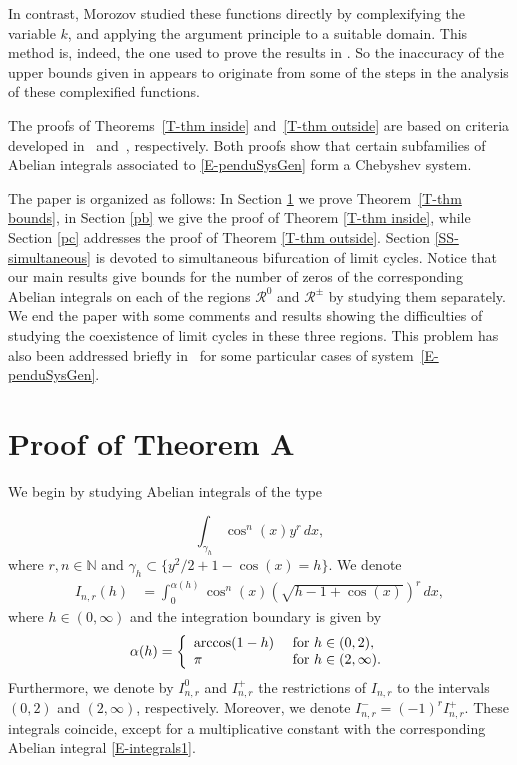 \documentclass[12pt,psamsfonts]{amsart}
\begin{document}
In contrast, Morozov studied these functions directly by complexifying the variable $k$, and
applying the argument principle to a suitable domain. This method is, indeed,  the one used to prove the results in \cite{Gasull2002}.  So the inaccuracy of the  upper bounds given in \cite{Morozov} appears to originate from some of the steps in the analysis of these complexified functions.

The proofs of Theorems~\ref{T-thm inside} and~\ref{T-thm outside} are based on criteria developed
in~\cite{Grau2011} and~\cite{Gasull2012b}, respectively. Both proofs show that certain subfamilies
of Abelian integrals associated  to \eqref{E-penduSysGen}  form a Chebyshev system. 

\bigskip

The  paper is organized as follows:  In Section \ref{pa} we prove Theorem~\ref{T-thm bounds}, in
Section \ref{pb} we give the proof of Theorem \ref{T-thm inside}, while Section \ref{pc} addresses the proof of Theorem \ref{T-thm outside}.  Section \ref{SS-simultaneous} is devoted to
simultaneous bifurcation of limit cycles. Notice that our main results give bounds for the number
of zeros of the corresponding Abelian integrals on each of the  regions $\mathcal{R}^0$ and
$\mathcal{R}^\pm$ by studying  them separately. We end the paper with some comments and results
showing the difficulties of studying the coexistence of limit cycles in these three regions.
This problem has also been addressed briefly in~\cite{Morozov1989,Sanders1986} for
some particular cases of system~\eqref{E-penduSysGen}.

\section{Proof of Theorem A}\label{pa}
We begin by studying Abelian integrals of the type

\begin{equation}
\label{E-integrals1}
    \int_{{\gamma}_h} \cos^n(x) y^r \, dx,
\end{equation}
where $r,n\in{\mathbb{N}}$ and ${\gamma}_h\subset\{{y^2}/{2}+1-\cos(x)=h\}$. We denote
\begin{align}
\label{E-integrals2}
    I_{n,r} (h) & =   \int_0^{{\alpha}(h)} \cos^n(x) \left(\sqrt{h-1+\cos(x)}\right)^r \, dx,
\end{align}
where ${h}\in(0,\infty)$ and the integration boundary is given by
\begin{equation*}
    {\alpha}(h)=  \left\{
                  \begin{array}{l l}
                        \arccos(1-h)  &\text{ for } {h}\in(0,2),\\
                        \pi                  &  \text{ for } {h}\in(2,\infty).
                  \end{array}\right.
\end{equation*}
Furthermore, we denote by $I^0_{n,r}$  and $I^+_{n,r}$ the restrictions of $I_{n,r}$ to the
intervals $(0,2)$ and $(2,\infty)$, respectively. Moreover, we denote $I^-_{n,r}=(-1)^r I^+_{n,r}$.
These
integrals coincide, except for a multiplicative constant with the corresponding Abelian integral
\eqref{E-integrals1}.
\end{document}
